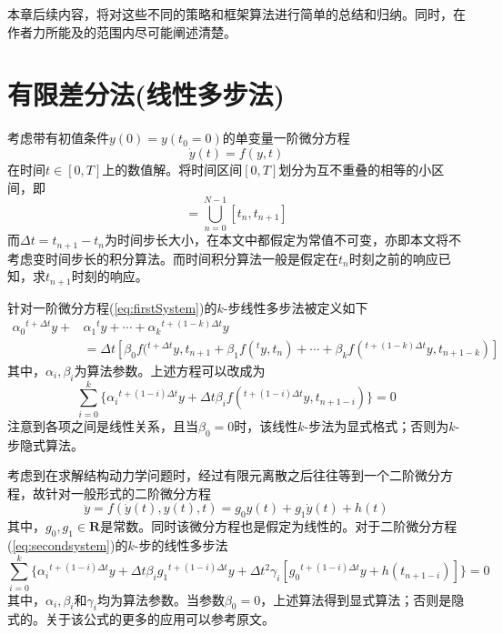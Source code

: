 本章后续内容，将对这些不同的策略和框架算法进行简单的总结和归纳。同时，在作者力所能及的范围内尽可能阐述清楚。
\section{有限差分法(线性多步法)}
考虑带有初值条件$y(0)=y(t_0=0)$的单变量一阶微分方程
\begin{equation}
\dot{y}(t)=f(y,t)\label{eq:firstSystem}
\end{equation}
在时间$t\in[0,T]$上的数值解。将时间区间$[0,T]$划分为互不重叠的相等的小区间，即
\begin{equation}
[0,T]=\bigcup_{n=0}^{N-1}[t_n,t_{n+1}]
\end{equation}
而$\Delta t=t_{n+1}-t_n$为时间步长大小，在本文中都假定为常值不可变，亦即本文将不考虑变时间步长的积分算法。而时间积分算法一般是假定在$t_n$时刻之前的响应已知，求$t_{n+1}$时刻的响应。

针对一阶微分方程(\ref{eq:firstSystem})的$k$-步线性多步法\cite{Hughes2000c,Gear1971c}被定义如下
\begin{equation}
\begin{split}
\alpha_0{^{t+\Delta t}\!y}+&\alpha_1{^{t}\!y}+\cdots+\alpha_k{^{t+(1-k)\Delta t}\!y}\\
&=\Delta t[\beta_0f({^{t+\Delta t}\!y},t_{n+1}+\beta_1f({^{t}\!y},t_{n})+\cdots+\beta_kf({^{t+(1-k)\Delta t}\!y},t_{n+1-k})]
\end{split}
\end{equation}
其中，$\alpha_i,\beta_i$为算法参数。上述方程可以改成为
\begin{equation}
\sum_{i=0}^k\{\alpha_i{^{t+(1-i)\Delta t}\!y}+\Delta t\beta_if({^{t+(1-i)\Delta t}\!y},t_{n+1-i}) \}=0\label{eq:firstsystemLMS}
\end{equation}
注意到各项之间是线性关系，且当$\beta_0=0$时，该线性$k$-步法为显式格式；否则为$k$-步隐式算法。

考虑到在求解结构动力学问题时，经过有限元离散之后往往等到一个二阶微分方程，故针对一般形式的二阶微分方程
\begin{equation}
\ddot{y}=f(\dot{y}(t),y(t),t)=g_0y(t)+g_1\dot{y}(t)+h(t)\label{eq:secondsystem}
\end{equation}
其中，$g_0,g_1\in\mathbf{R}$是常数。同时该微分方程也是假定为线性的。对于二阶微分方程(\ref{eq:secondsystem})的$k$-步的线性多步法\cite{Geradin1974c}
\begin{equation}
\sum_{i=0}^{k}\{\alpha_i{^{t+(1-i)\Delta t}\!y}+\Delta t\beta_ig_1{^{t+(1-i)\Delta t}\!y}+\Delta t^2\gamma_i[g_0{^{t+(1-i)\Delta t}\!y}+h(t_{n+1-i})]\}=0
\end{equation}
其中，$\alpha_i,\beta_i$和$\gamma_i$均为算法参数。当参数$\beta_0=0$，上述算法得到显式算法；否则是隐式的。关于该公式的更多的应用可以参考原文。
